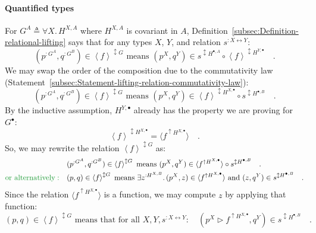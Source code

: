 \paragraph{Quantified types}

For $G^{A}\triangleq\forall X.\,H^{X,A}$ where $H^{X,A}$ is covariant
in $A$, Definition~\ref{subsec:Definition-relational-lifting} says
that for any types $X$, $Y$, and relation $s^{:X\leftrightarrow Y}$:
\[
(p^{:G^{A}},q^{:G^{B}})\in\left<f\right>^{\updownarrow G}\text{ means }(p^{X},q^{Y})\in s^{\updownarrow H^{\bullet,A}}\circ\left<f\right>^{\updownarrow H^{Y,\bullet}}\quad.
\]
We may swap the order of the composition due to the commutativity
law (Statement~\ref{subsec:Statement-lifting-relation-commutativity-law}):
\[
(p^{:G^{A}},q^{:G^{B}})\in\left<f\right>^{\updownarrow G}\text{ means }(p^{X},q^{Y})\in\left<f\right>^{\updownarrow H^{X,\bullet}}\circ s^{\updownarrow H^{\bullet,B}}\quad.
\]
By the inductive assumption, $H^{Y,\bullet}$ already has the property
we are proving for $G^{\bullet}$:
\[
\left<f\right>^{\updownarrow H^{X,\bullet}}=\langle f^{\uparrow H^{X,\bullet}}\rangle\quad.
\]
So, we may rewrite the relation $\left<f\right>^{\updownarrow G}$
as: 
\begin{align*}
 & (p^{:G^{A}},q^{:G^{B}})\in\left<f\right>^{\updownarrow G}\text{ means }(p^{X},q^{Y})\in\langle f^{\uparrow H^{X,\bullet}}\rangle\circ s^{\updownarrow H^{\bullet,B}}\quad.\\
{\color{greenunder}\text{or alternatively}:}\quad & (p,q)\in\left<f\right>^{\updownarrow G}\text{ means }\exists z^{:H^{X,B}}.\,(p^{X},z)\in\langle f^{\uparrow H^{X,\bullet}}\rangle\text{ and }(z,q^{Y})\in s^{\updownarrow H^{\bullet,B}}\quad.
\end{align*}
Since the relation $\langle f^{\uparrow H^{X,\bullet}}\rangle$ is
a function, we may compute $z$ by applying that function:
\begin{equation}
(p,q)\in\left<f\right>^{\updownarrow G}\text{ means that for all }X,Y,s^{:X\leftrightarrow Y}:\quad(p^{X}\triangleright f^{\uparrow H^{X,\bullet}},q^{Y})\in s^{\updownarrow H^{\bullet,B}}\quad.\label{eq:relational-universal-lifting-derivation1}
\end{equation}

